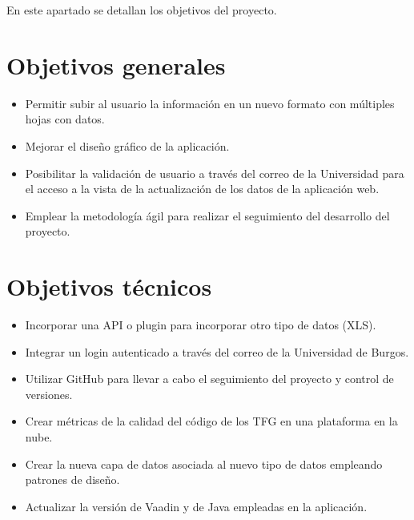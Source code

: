 En este apartado se detallan los objetivos del proyecto.

\section{Objetivos generales}
\begin{itemize}
	\item Permitir subir al usuario la información en un nuevo formato con múltiples hojas con datos.
	\item Mejorar el diseño gráfico de la aplicación.
	\item Posibilitar la validación de usuario a través del correo de la Universidad para el acceso a la vista de la actualización de los datos de la aplicación web.
	\item Emplear la metodología ágil para realizar el seguimiento del desarrollo del proyecto.
\end{itemize}

\section{Objetivos técnicos}
\begin{itemize}
	\item Incorporar una API o plugin para incorporar otro tipo de datos (XLS).
	\item Integrar un login autenticado a través del correo de la Universidad de Burgos.
	\item Utilizar GitHub para llevar a cabo el seguimiento del proyecto y control de versiones.
	\item Crear métricas de la calidad del código de los TFG en una plataforma en la nube.
	\item Crear la nueva capa de datos asociada al nuevo tipo de datos empleando patrones de diseño.
	\item Actualizar la versión de Vaadin y de Java empleadas en la aplicación.
\end{itemize}
